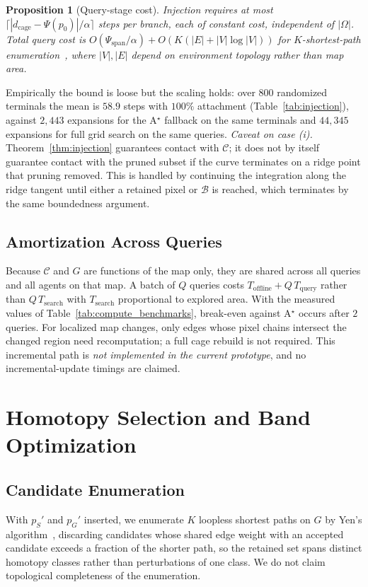 \documentclass[conference]{IEEEtran}
\newtheorem{proposition}{Proposition}
\begin{document}
\begin{proposition}[Query-stage cost]
Injection requires at most $\lceil |d_{\mathrm{cage}}-\Psi(p_0)|/\alpha \rceil$ steps per branch, each of constant cost, independent of $|\Omega|$. Total query cost is $O(\Psi_{\text{span}}/\alpha) + O(K(|E|+|V|\log|V|))$ for $K$-shortest-path enumeration~\cite{yen1971}, where $|V|,|E|$ depend on environment topology rather than map area.
\end{proposition}
Empirically the bound is loose but the scaling holds: over $800$ randomized terminals the mean is $58.9$ steps with $100\%$ attachment (Table~\ref{tab:injection}), against $2{,}443$ expansions for the A$^\star$ fallback on the same terminals and $44{,}345$ expansions for full grid search on the same queries.
\emph{Caveat on case (i).} Theorem~\ref{thm:injection} guarantees contact with $\mathcal{C}$; it does not by itself guarantee contact with the pruned subset if the curve terminates on a ridge point that pruning removed. This is handled by continuing the integration along the ridge tangent until either a retained pixel or $\mathcal{B}$ is reached, which terminates by the same boundedness argument.
\subsection{Amortization Across Queries}
Because $\mathcal{C}$ and $G$ are functions of the map only, they are shared across all queries and all agents on that map. A batch of $Q$ queries costs $T_{\mathrm{offline}} + Q\,T_{\mathrm{query}}$ rather than $Q\,T_{\mathrm{search}}$ with $T_{\mathrm{search}}$ proportional to explored area. With the measured values of Table~\ref{tab:compute_benchmarks}, break-even against A$^\star$ occurs after $2$ queries.
For localized map changes, only edges whose pixel chains intersect the changed region need recomputation; a full cage rebuild is not required. This incremental path is \emph{not implemented in the current prototype}, and no incremental-update timings are claimed.
\section{Homotopy Selection and Band Optimization}
\label{sec:opt}
\subsection{Candidate Enumeration}
With $p_S'$ and $p_G'$ inserted, we enumerate $K$ loopless shortest paths on $G$ by Yen's algorithm~\cite{yen1971}, discarding candidates whose shared edge weight with an accepted candidate exceeds a fraction of the shorter path, so the retained set spans distinct homotopy classes rather than perturbations of one class. We do not claim topological completeness of the enumeration.
\end{document}
